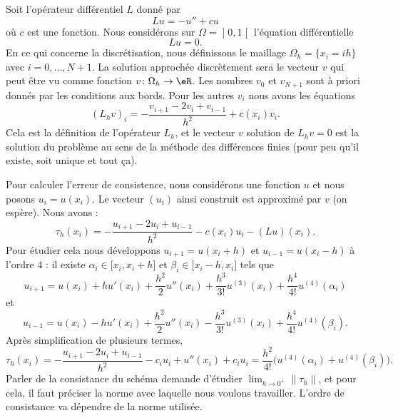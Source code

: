 Soit l'opérateur différentiel \( L\) donné par
\begin{equation}
	Lu=-u''+cu
\end{equation}
où \( c\) est une fonction. Nous considérons sur \( \Omega=\mathopen] 0 , 1 \mathclose[\) l'équation différentielle
\begin{equation}
	Lu=0.
\end{equation}
En ce qui concerne la discrétisation, nous définissons le maillage \( \Omega_h=\{x_i=ih\}\) avec \( i=0,\ldots, N+1\). La solution approchée discrètement sera le vecteur \( v\) qui peut être vu comme fonction \( v\colon \Omega_h\to \eR\). Les nombres \( v_0\) et \( v_{N+1}\) sont à priori donnés par les conditions aux bords. Pour les autres \( v_i\) nous avons les équations
\begin{equation}
	(L_hv)_i=-\frac{ v_{i+1}-2v_i+v_{i-1} }{ h^2 }+c(x_i)v_i.
\end{equation}
Cela est la définition de l'opérateur \( L_h\), et le vecteur \( v\) solution de \( L_hv=0\) est la solution du problème au sens de la méthode des différences finies (pour peu qu'il existe, soit unique et tout ça).

Pour calculer l'erreur de consistence, nous considérons une fonction \( u\) et nous posons \( u_i=u(x_i)\). Le vecteur \( (u_i)\) ainsi construit est approximé par \( v\) (on espère). Nous avons :
\begin{equation}
	\tau_h(x_i)=-\frac{ u_{i+1}-2u_i+u_{i-1} }{ h^2 }-c(x_i)u_i-(Lu)(x_i).
\end{equation}
Pour étudier cela nous développons \( u_{i+1}=u(x_i+h)\) et \( u_{i-1}=u(x_i-h)\) à l'ordre \( 4\) : il existe \( \alpha_i\in\mathopen[ x_i , x_i+h \mathclose]\) et \( \beta_i\in\mathopen[ x_i-h , x_i \mathclose]\) tels que
\begin{equation}
	u_{i+1}=u(x_i)+hu'(x_i)+\frac{ h^2 }{2}u''(x_i)+\frac{ h^3 }{ 3! }u^{(3)}(x_i)+\frac{ h^4 }{ 4! }u^{(4)}(\alpha_i)
\end{equation}
et
\begin{equation}
	u_{i-1}=u(x_i)-hu'(x_i)+\frac{ h^2 }{2}u''(x_i)-\frac{ h^3 }{ 3! }u^{(3)}(x_i)+\frac{ h^4 }{ 4! }u^{(4)}(\beta_i).
\end{equation}
Après simplification de plusieurs termes,
\begin{equation}
	\tau_h(x_i)=-\frac{ u_{i+1}-2u_i+u_{i-1} }{ h^2 }-c_iu_i+u''(x_i)+c_iu_i=\frac{ h^2 }{ 4! }\big( u^{(4)}(\alpha_i)+u^{(4)}(\beta_i) \big).
\end{equation}
Parler de la consistance du schéma demande d'étudier \( \lim_{h\to 0^+}\| \tau_h \| \), et pour cela, il faut préciser la norme avec laquelle nous voulons travailler. L'ordre de consistance va dépendre de la norme utilisée.


